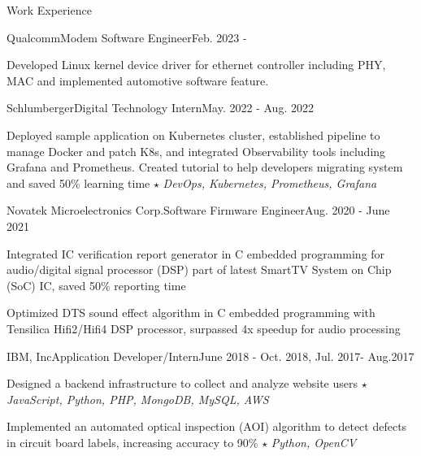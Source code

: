 \documentclass{resume_short} %
\begin{document}
\begin{rSection}{Work Experience}
    \begin{rSubsection3}{Qualcomm}{Modem Software Engineer}{Feb. 2023 - }
        \item Developed Linux kernel device driver for ethernet controller including PHY, MAC and implemented automotive software feature.
    \end{rSubsection3}
    \begin{rSubsection3}{Schlumberger}{Digital Technology Intern}{May. 2022 - Aug. 2022}
        \item Deployed sample application on Kubernetes cluster, established pipeline to manage Docker and patch K8s, and integrated Observability tools including Grafana and Prometheus. Created tutorial to help developers migrating system and saved 50\% learning time $\star$ {\em DevOps, Kubernetes, Prometheus, Grafana}
    \end{rSubsection3}
    \begin{rSubsection3}{Novatek Microelectronics Corp.}{Software Firmware Engineer}{Aug. 2020 - June 2021}
        \item Integrated IC verification report generator in C embedded programming for audio/digital signal processor (DSP) part of latest SmartTV System on Chip (SoC) IC, saved 50\% reporting time
        \item Optimized DTS sound effect algorithm in C embedded programming with Tensilica Hifi2/Hifi4 DSP processor, surpassed 4x speedup for audio processing
    \end{rSubsection3}
    \begin{rSubsection3}{IBM, Inc}{Application Developer/Intern}{June 2018 - Oct. 2018, Jul. 2017- Aug.2017}
        \item Designed a backend infrastructure to collect and analyze website users $\star$ {\em JavaScript, Python, PHP, MongoDB, MySQL, AWS}
        \item Implemented an automated optical inspection (AOI) algorithm to 
              detect defects in circuit board labels, increasing accuracy to 90\% $\star$ {\em Python, OpenCV}
    \end{rSubsection3}
\end{rSection}
\end{document}
